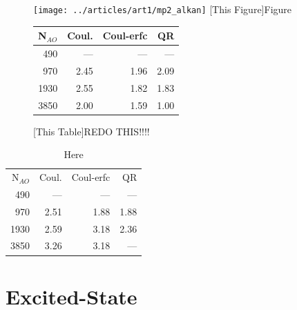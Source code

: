 \begin{figure}
\begin{minipage}{0.5\textwidth}
\texttt{[image: ../articles/art1/mp2\_alkan]}
[This Figure]{Figure}
\end{minipage}
\hspace{0.05\textwidth}
\begin{minipage}{0.3\textwidth}
\begin{tabular}{rrrr}
\hline
N$_{AO}$ & Coul. & Coul-erfc & QR \\ \hline
490 & --- & --- 	& --- \\ 
970	& 2.45 & 1.96 & 2.09 \\
1930	 & 2.55 & 1.82 & 1.83 \\
3850	 & 2.00 & 1.59 & 1.00 \\
 \hline
\end{tabular}
[This Table]{REDO THIS!!!!}
\end{minipage}
\end{figure}

\begin{table}
\begin{tabular}{rrrr}
N$_{AO}$ & Coul. & Coul-erfc & QR \\ 
490 & --- & --- & --- \\ 
970 & 2.51 & 1.88 & 1.88 \\ 
1930 & 2.59 & 3.18 & 2.36 \\ 
3850 & 3.26 & 3.18 & --- \\ 
\end{tabular}
\caption{Here}
\label{}
\end{table}

\section{Excited-State}